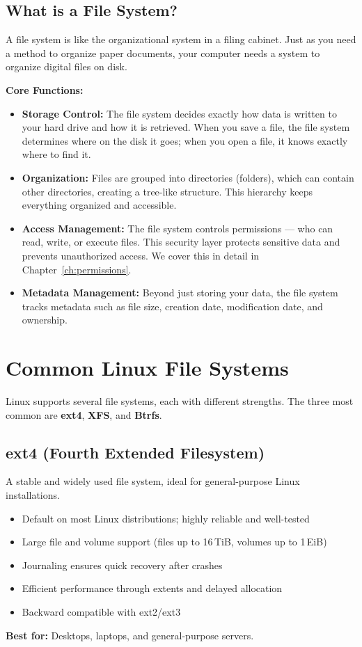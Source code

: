 \subsection{What is a File System?}
A file system is like the organizational system in a filing cabinet. Just as you need a method to organize paper documents, your computer needs a system to organize digital files on disk.

\textbf{Core Functions:}
\begin{itemize}
    \item \textbf{Storage Control:} The file system decides exactly how data is written to your hard drive and how it is retrieved. When you save a file, the file system determines where on the disk it goes; when you open a file, it knows exactly where to find it.
    \item \textbf{Organization:} Files are grouped into directories (folders), which can contain other directories, creating a tree-like structure. This hierarchy keeps everything organized and accessible.
    \item \textbf{Access Management:} The file system controls permissions — who can read, write, or execute files. This security layer protects sensitive data and prevents unauthorized access. We cover this in detail in Chapter~\ref{ch:permissions}.
    \item \textbf{Metadata Management:} Beyond just storing your data, the file system tracks metadata such as file size, creation date, modification date, and ownership.
\end{itemize}

\section{Common Linux File Systems}
Linux supports several file systems, each with different strengths. The three most common are \textbf{ext4}, \textbf{XFS}, and \textbf{Btrfs}.

\subsection{ext4 (Fourth Extended Filesystem)}
A stable and widely used file system, ideal for general-purpose Linux installations.
\begin{itemize}
    \item Default on most Linux distributions; highly reliable and well-tested
    \item Large file and volume support (files up to 16\,TiB, volumes up to 1\,EiB)
    \item Journaling ensures quick recovery after crashes
    \item Efficient performance through extents and delayed allocation
    \item Backward compatible with ext2/ext3
\end{itemize}
\textbf{Best for:} Desktops, laptops, and general-purpose servers.

